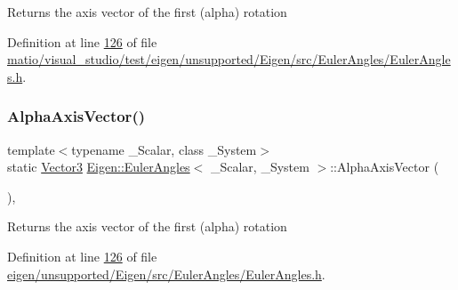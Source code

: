 \begin{DoxyReturn}{Returns}
the axis vector of the first (alpha) rotation 
\end{DoxyReturn}


Definition at line \hyperlink{matio_2visual__studio_2test_2eigen_2unsupported_2_eigen_2src_2_euler_angles_2_euler_angles_8h_source_l00126}{126} of file \hyperlink{matio_2visual__studio_2test_2eigen_2unsupported_2_eigen_2src_2_euler_angles_2_euler_angles_8h_source}{matio/visual\+\_\+studio/test/eigen/unsupported/\+Eigen/src/\+Euler\+Angles/\+Euler\+Angles.\+h}.

\mbox{\label{class_eigen_1_1_euler_angles_a33d034ea7e8cac1f4d7c329d741b9a59}} 
\subsubsection{\texorpdfstring{Alpha\+Axis\+Vector()}{AlphaAxisVector()}\hspace{0.1cm}{\footnotesize\ttfamily [2/2]}}
{\footnotesize\ttfamily template$<$typename \+\_\+\+Scalar, class \+\_\+\+System$>$ \\
static \hyperlink{class_eigen_1_1_euler_angles_af0f446aa0f46b3439abedff63fabf39c}{Vector3} \hyperlink{class_eigen_1_1_euler_angles}{Eigen\+::\+Euler\+Angles}$<$ \+\_\+\+Scalar, \+\_\+\+System $>$\+::Alpha\+Axis\+Vector (\begin{DoxyParamCaption}{ }\end{DoxyParamCaption})\hspace{0.3cm}{\ttfamily [inline]}, {\ttfamily [static]}}

\begin{DoxyReturn}{Returns}
the axis vector of the first (alpha) rotation 
\end{DoxyReturn}


Definition at line \hyperlink{eigen_2unsupported_2_eigen_2src_2_euler_angles_2_euler_angles_8h_source_l00126}{126} of file \hyperlink{eigen_2unsupported_2_eigen_2src_2_euler_angles_2_euler_angles_8h_source}{eigen/unsupported/\+Eigen/src/\+Euler\+Angles/\+Euler\+Angles.\+h}.

\mbox{\label{class_eigen_1_1_euler_angles_a2decf84b5efd265f7251fd32f539a36b}} 
